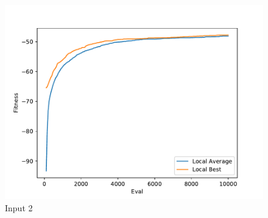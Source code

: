 \documentclass{standalone}
\begin{document}
\begin{figure}[!htb]
	\caption{Input 2}
	\label{fig:graph_2020}
	\includegraphics[width=\textwidth]{../graphs/graphs/2020.pdf}
\end{figure}
\end{document}

